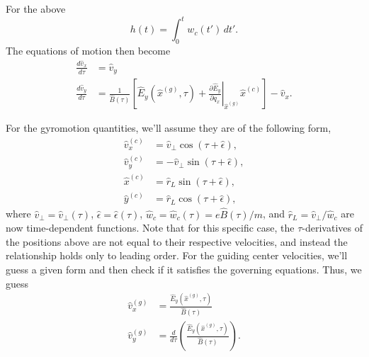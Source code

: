 \documentclass[a4paper,11pt]{report}
\begin{document}
For the above
\begin{equation}
    h(t) = \int_0^t w_c(t') \, dt'.
\end{equation}
The equations of motion then become
\begin{align}
\label{eq:time_var_B_inter_1}
    \frac{d \hat{v}_x}{d \tau} &= \hat{v}_y \nonumber \\
    \frac{d \hat{v}_y}{d \tau} &= \frac{1}{\hat{B}(\tau)} \left [ \hat{E}_y(\hat{x}^{(g)},\tau) + \left .\frac{\partial \hat{E}_y}{\partial q_x} \right |_{\hat{x}^{(g)}} \hat{x}^{(c)} \right ] - \hat{v}_x.
\end{align}

For the gyromotion quantities, we'll assume they are of the following form,
\begin{align}
    \hat{v}_x^{(c)} &= \hat{v}_\perp \cos(\tau + \hat{\epsilon}), \\
    \hat{v}_y^{(c)} &= -\hat{v}_\perp \sin(\tau + \hat{\epsilon}), \\
    \hat{x}^{(c)} &= \hat{r}_L \sin(\tau + \hat{\epsilon}), \\
    \hat{y}^{(c)} &= \hat{r}_L \cos(\tau + \hat{\epsilon}),
\end{align} 
where $\hat{v}_\perp = \hat{v}_\perp(\tau)$, $\hat{\epsilon} = \hat{\epsilon}(\tau)$, $\hat{w}_c = \hat{w}_c(\tau) = e \hat{B}(\tau)/m$, and $\hat{r}_L = \hat{v}_\perp / \hat{w}_c$ are now time-dependent functions. Note that for this specific case, the $\tau$-derivatives of the positions above are not equal to their respective velocities, and instead the relationship holds only to leading order. For the guiding center velocities, we'll guess a given form and then check if it satisfies the governing equations. Thus, we guess
\begin{align}
    \hat{v}_x^{(g)} &= \frac{\hat{E}_y(\hat{x}^{(g)},\tau)}{\hat{B}(\tau)} \nonumber \\
    \hat{v}_y^{(g)} &= \frac{d}{d \tau} \left ( \frac{\hat{E}_y(\hat{x}^{(g)},\tau)}{\hat{B}(\tau)} \right ).
\end{align}
\end{document}
